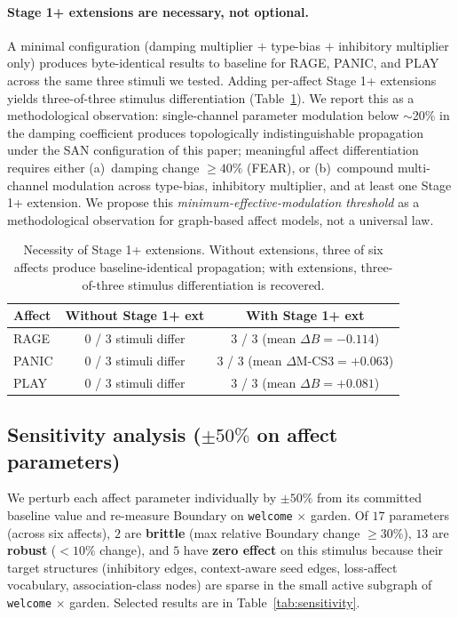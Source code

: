 \documentclass{article}
\begin{document}
\paragraph{Stage 1+ extensions are necessary, not optional.}
A minimal configuration (damping multiplier $+$ type-bias $+$ inhibitory
multiplier only) produces byte-identical results to baseline for RAGE,
PANIC, and PLAY across the same three stimuli we tested. Adding per-affect
Stage 1+ extensions yields three-of-three stimulus differentiation
(Table~\ref{tab:stage1plus}). We report this as a methodological
observation: single-channel parameter modulation below $\sim$20\% in the
damping coefficient produces topologically indistinguishable propagation
under the SAN configuration of this paper; meaningful affect
differentiation requires either (a)~damping change $\geq 40\%$ (FEAR), or
(b)~compound multi-channel modulation across type-bias, inhibitory
multiplier, and at least one Stage 1+ extension. We propose this
\emph{minimum-effective-modulation threshold} as a methodological
observation for graph-based affect models, not a universal law.

\begin{table}[h]
\centering
\caption{Necessity of Stage 1+ extensions. Without extensions, three of
six affects produce baseline-identical propagation; with extensions,
three-of-three stimulus differentiation is recovered.}
\label{tab:stage1plus}
\begin{tabular}{lcc}
\toprule
Affect & Without Stage 1+ ext & With Stage 1+ ext \\
\midrule
RAGE   & 0 / 3 stimuli differ & 3 / 3 (mean $\Delta B = -0.114$) \\
PANIC  & 0 / 3 stimuli differ & 3 / 3 (mean $\Delta \text{M-CS3} = +0.063$) \\
PLAY   & 0 / 3 stimuli differ & 3 / 3 (mean $\Delta B = +0.081$) \\
\bottomrule
\end{tabular}
\end{table}

\subsection{Sensitivity analysis ($\pm 50\%$ on affect parameters)}
\label{subsec:sensitivity}

We perturb each affect parameter individually by $\pm 50\%$ from its
committed baseline value and re-measure Boundary on
\texttt{welcome} $\times$ garden. Of $17$ parameters (across six affects),
$2$ are \textbf{brittle} (max relative Boundary change $\geq 30\%$), $13$
are \textbf{robust} ($< 10\%$ change), and $5$ have \textbf{zero effect}
on this stimulus because their target structures (inhibitory edges,
context-aware seed edges, loss-affect vocabulary, association-class nodes)
are sparse in the small active subgraph of \texttt{welcome} $\times$
garden. Selected results are in Table~\ref{tab:sensitivity}.
\end{document}
